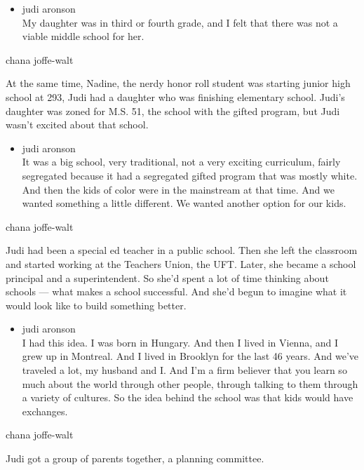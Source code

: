 \begin{itemize}
\tightlist
\item
  judi aronson\\
  My daughter was in third or fourth grade, and I felt that there was
  not a viable middle school for her.
\end{itemize}

chana joffe-walt

At the same time, Nadine, the nerdy honor roll student was starting
junior high school at 293, Judi had a daughter who was finishing
elementary school. Judi's daughter was zoned for M.S. 51, the school
with the gifted program, but Judi wasn't excited about that school.

\begin{itemize}
\tightlist
\item
  judi aronson\\
  It was a big school, very traditional, not a very exciting curriculum,
  fairly segregated because it had a segregated gifted program that was
  mostly white. And then the kids of color were in the mainstream at
  that time. And we wanted something a little different. We wanted
  another option for our kids.
\end{itemize}

chana joffe-walt

Judi had been a special ed teacher in a public school. Then she left the
classroom and started working at the Teachers Union, the UFT. Later, she
became a school principal and a superintendent. So she'd spent a lot of
time thinking about schools --- what makes a school successful. And
she'd begun to imagine what it would look like to build something
better.

\begin{itemize}
\tightlist
\item
  judi aronson\\
  I had this idea. I was born in Hungary. And then I lived in Vienna,
  and I grew up in Montreal. And I lived in Brooklyn for the last 46
  years. And we've traveled a lot, my husband and I. And I'm a firm
  believer that you learn so much about the world through other people,
  through talking to them through a variety of cultures. So the idea
  behind the school was that kids would have exchanges.
\end{itemize}

chana joffe-walt

Judi got a group of parents together, a planning committee.

